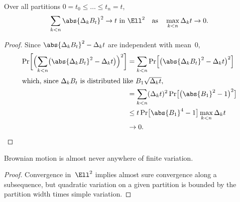 \begin	{theorem}
Over all partitions \( 0 = t_0 \le\dots\le t_n = t \), \[
	\text{\( \sum_{k<n} \abs{\Delta_k B_t}^2 \to t \) in~$\Ell^2$}
	\quad\text{as}\quad
	\max_{k<n} \Delta_k t \to 0
	\text.
\]
\end	{theorem}
\begin	{proof}
Since \( \abs{\Delta_k B_t}^2 - \Delta_k t \) are independent with mean~$0$,
\begin	{align*}
	\Pr\biggl[
		\Bigl( \sum_{k<n}
			\bigl( \abs{\Delta_k B_t}^2 - \Delta_k t \bigr) \Bigr)^2
	\biggr]
	&=	\sum_{k<n} \Pr\Bigl[
		\bigl( \abs{\Delta_k B_t}^2 - \Delta_k t \bigr)^2
	\Bigr] \\
\intertext
	{which, since $\Delta_k B_t$ is distributed
		like~$B_1\sqrt{\Delta_kt}$,}
	&=	\sum_{k<n} (\Delta_kt)^2
		\Pr\bigl[ \bigl(\abs{B_1}^2 - 1\bigr)^2 \bigr] \\
	&\le	t \Pr\bigl[ \abs{B_1}^4 - 1 \bigr] \max_{k<n} \Delta_kt \\
	&\to 0
	\text.
	\qedhere
\end	{align*}
\end	{proof}

\begin	{corollary}
Brownian motion is almost never anywhere of finite variation.
\end	{corollary}
\begin	{proof}
Convergence in~$\Ell^2$ implies almost sure convergence along a subsequence,
but quadratic variation on a given partition
is bounded by the partition width times simple variation.
\end	{proof}
